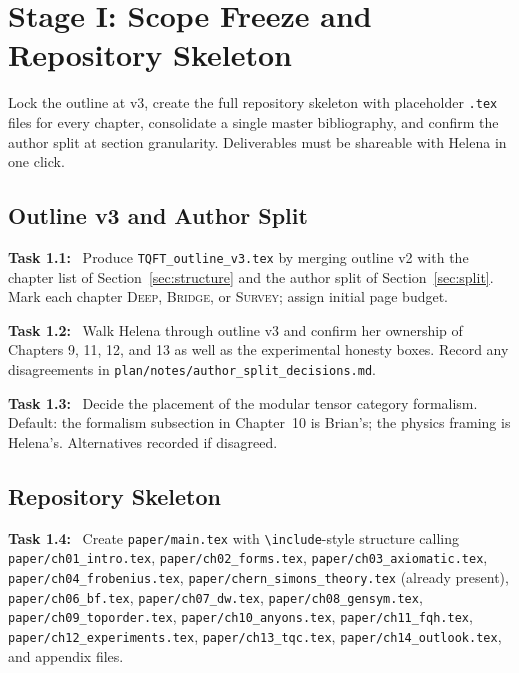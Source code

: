\documentclass[11pt]{article}
\newcommand{\task}[1]{\medskip\noindent\textbf{Task #1:}\ }
\begin{document}
\section{Stage I: Scope Freeze and Repository Skeleton}\label{sec:stageI}

\begin{goalbox}[Objective]
Lock the outline at v3, create the full repository skeleton with placeholder \texttt{.tex}
files for every chapter, consolidate a single master bibliography, and confirm the author
split at section granularity. Deliverables must be shareable with Helena in one click.
\end{goalbox}

\subsection{Outline v3 and Author Split}

\task{1.1} Produce \texttt{TQFT\_outline\_v3.tex} by merging outline v2 with the
chapter list of Section~\ref{sec:structure} and the author split of
Section~\ref{sec:split}. Mark each chapter \textsc{Deep}, \textsc{Bridge}, or \textsc{Survey};
assign initial page budget.

\task{1.2} Walk Helena through outline v3 and confirm her ownership of Chapters 9, 11,
12, and 13 as well as the experimental honesty boxes. Record any disagreements in
\texttt{plan/notes/author\_split\_decisions.md}.

\task{1.3} Decide the placement of the modular tensor category formalism. Default: the
formalism subsection in Chapter~10 is Brian's; the physics framing is Helena's. Alternatives
recorded if disagreed.

\subsection{Repository Skeleton}

\task{1.4} Create \texttt{paper/main.tex} with \texttt{\textbackslash include}-style
structure calling \texttt{paper/ch01\_intro.tex}, \texttt{paper/ch02\_forms.tex},
\texttt{paper/ch03\_axiomatic.tex}, \texttt{paper/ch04\_frobenius.tex},
\texttt{paper/chern\_simons\_theory.tex} (already present), \texttt{paper/ch06\_bf.tex},
\texttt{paper/ch07\_dw.tex}, \texttt{paper/ch08\_gensym.tex},
\texttt{paper/ch09\_toporder.tex}, \texttt{paper/ch10\_anyons.tex},
\texttt{paper/ch11\_fqh.tex}, \texttt{paper/ch12\_experiments.tex},
\texttt{paper/ch13\_tqc.tex}, \texttt{paper/ch14\_outlook.tex}, and appendix files.
\end{document}
